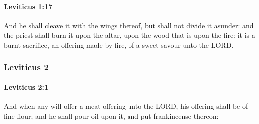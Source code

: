 		\paragraph{Leviticus 1:17} %
			\label{LEVITICUS-1-17}

			And he shall cleave it with the wings thereof, but shall not divide it asunder: and the priest shall burn it upon the altar, upon the wood that is upon the fire: it is a burnt sacrifice, an offering made by fire, of a sweet savour unto the LORD.

	\subsubsection{Leviticus 2} %
		\label{LEVITICUS-2}

		\paragraph{Leviticus 2:1} %
			\label{LEVITICUS-2-1}

			And when any will offer a meat offering unto the LORD, his offering shall be of fine flour; and he shall pour oil upon it, and put frankincense thereon:

